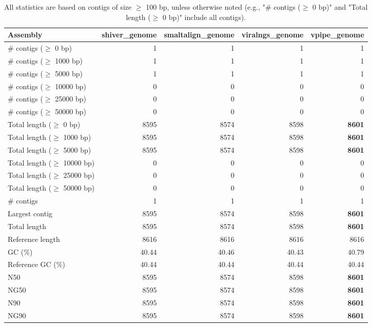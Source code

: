 \documentclass[12pt,a4paper]{article}
\begin{document}
\begin{table}[ht]
\begin{center}
\caption{All statistics are based on contigs of size $\geq$ 100 bp, unless otherwise noted (e.g., "\# contigs ($\geq$ 0 bp)" and "Total length ($\geq$ 0 bp)" include all contigs).}
\begin{tabular}{|l*{4}{|r}|}
\hline
Assembly & shiver\_genome & smaltalign\_genome & viralngs\_genome & vpipe\_genome \\ \hline
\# contigs ($\geq$ 0 bp) & 1 & 1 & 1 & 1 \\ \hline
\# contigs ($\geq$ 1000 bp) & 1 & 1 & 1 & 1 \\ \hline
\# contigs ($\geq$ 5000 bp) & 1 & 1 & 1 & 1 \\ \hline
\# contigs ($\geq$ 10000 bp) & 0 & 0 & 0 & 0 \\ \hline
\# contigs ($\geq$ 25000 bp) & 0 & 0 & 0 & 0 \\ \hline
\# contigs ($\geq$ 50000 bp) & 0 & 0 & 0 & 0 \\ \hline
Total length ($\geq$ 0 bp) & 8595 & 8574 & 8598 & {\bf 8601} \\ \hline
Total length ($\geq$ 1000 bp) & 8595 & 8574 & 8598 & {\bf 8601} \\ \hline
Total length ($\geq$ 5000 bp) & 8595 & 8574 & 8598 & {\bf 8601} \\ \hline
Total length ($\geq$ 10000 bp) & 0 & 0 & 0 & 0 \\ \hline
Total length ($\geq$ 25000 bp) & 0 & 0 & 0 & 0 \\ \hline
Total length ($\geq$ 50000 bp) & 0 & 0 & 0 & 0 \\ \hline
\# contigs & 1 & 1 & 1 & 1 \\ \hline
Largest contig & 8595 & 8574 & 8598 & {\bf 8601} \\ \hline
Total length & 8595 & 8574 & 8598 & {\bf 8601} \\ \hline
Reference length & 8616 & 8616 & 8616 & 8616 \\ \hline
GC (\%) & 40.44 & 40.46 & 40.43 & 40.79 \\ \hline
Reference GC (\%) & 40.44 & 40.44 & 40.44 & 40.44 \\ \hline
N50 & 8595 & 8574 & 8598 & {\bf 8601} \\ \hline
NG50 & 8595 & 8574 & 8598 & {\bf 8601} \\ \hline
N90 & 8595 & 8574 & 8598 & {\bf 8601} \\ \hline
NG90 & 8595 & 8574 & 8598 & {\bf 8601} \\ \hline

\end{tabular}
\end{center}
\end{table}
\end{document}
